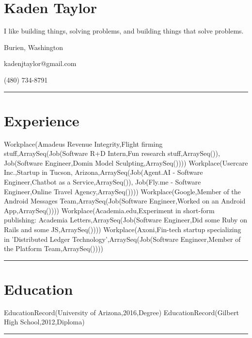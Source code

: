 \documentclass{article}
\begin{document}
\section*{Kaden Taylor}

I like building things, solving problems, and building things that solve problems.
\newline

Burien, Washington

kadenjtaylor@gmail.com

(480) 734-8791

\noindent\rule{\linewidth}{1pt}

\section*{Experience}

Workplace(Amadeus Revenue Integrity,Flight firming stuff,ArraySeq(Job(Software R+D Intern,Fun research stuff,ArraySeq()), Job(Software Engineer,Domin Model Sculpting,ArraySeq())))\newline
\newline
Workplace(Usercare Inc.,Startup in Tucson, Arizona,ArraySeq(Job(Agent.AI - Software Engineer,Chatbot as a Service,ArraySeq()), Job(Fly.me - Software Engineer,Online Travel Agency,ArraySeq())))\newline
\newline
Workplace(Google,Member of the Android Messages Team,ArraySeq(Job(Software Engineer,Worked on an Android App,ArraySeq())))\newline
\newline
Workplace(Academia.edu,Experiment in short-form publishing: Academia Letters,ArraySeq(Job(Software Engineer,Did some Ruby on Rails and some JS,ArraySeq())))\newline
\newline
Workplace(Axoni,Fin-tech startup specializing in 'Distributed Ledger Technology',ArraySeq(Job(Software Engineer,Member of the Platform Team,ArraySeq())))

\noindent\rule{\linewidth}{1pt}

\section*{Education}

EducationRecord(University of Arizona,2016,Degree)\newline
\newline
EducationRecord(Gilbert High School,2012,Diploma)

\noindent\rule{\linewidth}{1pt}
\end{document}
